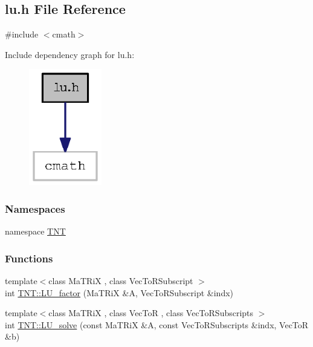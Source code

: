 \subsection{lu.h File Reference}
\label{lu_8h}
{\ttfamily \#include $<$cmath$>$}\par
Include dependency graph for lu.h:
\nopagebreak
\begin{figure}[H]
\begin{center}
\leavevmode
\includegraphics[width=90pt]{lu_8h__incl}
\end{center}
\end{figure}
\subsubsection*{Namespaces}
\begin{DoxyCompactItemize}
\item 
namespace \hyperlink{namespace_t_n_t}{TNT}
\end{DoxyCompactItemize}
\subsubsection*{Functions}
\begin{DoxyCompactItemize}
\item 
{\footnotesize template$<$class MaTRiX , class VecToRSubscript $>$ }\\int \hyperlink{namespace_t_n_t_a61af2605f9847ba7a3132156e6702b6f}{TNT::LU\_\-factor} (MaTRiX \&A, VecToRSubscript \&indx)
\item 
{\footnotesize template$<$class MaTRiX , class VecToR , class VecToRSubscripts $>$ }\\int \hyperlink{namespace_t_n_t_a99e5258acbf1155d0d1fb9d326282e98}{TNT::LU\_\-solve} (const MaTRiX \&A, const VecToRSubscripts \&indx, VecToR \&b)
\end{DoxyCompactItemize}

